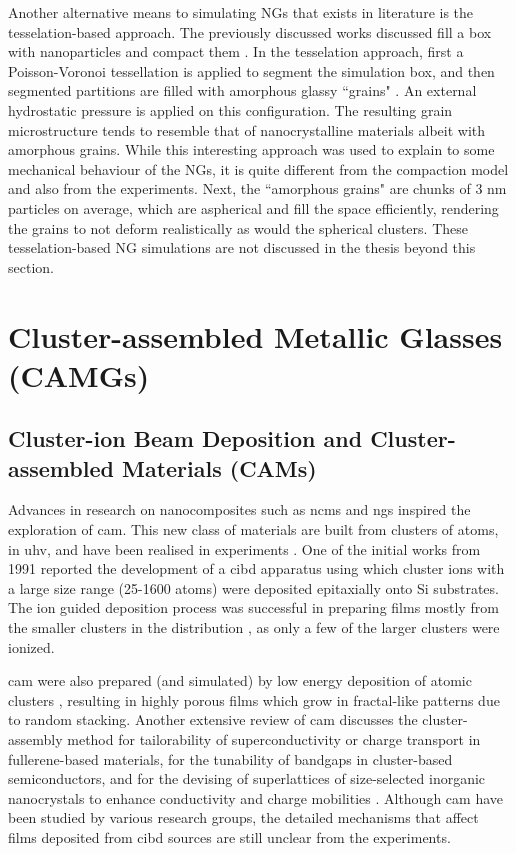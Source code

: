 Another alternative means to simulating NGs that exists in literature is the tesselation-based approach. The previously discussed works discussed fill a box with nanoparticles and compact them \cite{Sopu2009,Adjaoud2018,Adjaoud2019,Cheng2019,Cheng2019a}. In the tesselation approach, first a Poisson-Voronoi tessellation is applied to segment the simulation box, and then segmented partitions are filled with amorphous glassy ``grains" \cite{Adibi2014,Sha2017,Ma2020,Zheng2021}. An external hydrostatic pressure is applied on this configuration. The resulting grain microstructure tends to resemble that of nanocrystalline materials albeit with amorphous grains. While this interesting approach was used to explain to some mechanical behaviour of the NGs, it is quite different from the compaction model and also from the experiments. Next, the ``amorphous grains" are chunks of 3 nm particles on average, which are aspherical and  fill the space efficiently, rendering the grains to not deform realistically as would the spherical clusters. These tesselation-based NG simulations are not discussed in the thesis beyond this section. \par

\section{Cluster-assembled Metallic Glasses (CAMGs)} \label{s:camgs}

\subsection{Cluster-ion Beam Deposition and Cluster-assembled Materials (CAMs)}
Advances in research on nanocomposites such as \gls{ncm}s and \gls{ng}s inspired the exploration of \gls{cam}. This new class of materials are built from clusters of atoms, in \gls{uhv}, and have been realised in experiments \cite{Takagi1986,Takagi1988,Beuhler1986}. One of the initial works from 1991 reported the development of a \gls{cibd} apparatus using which cluster ions with a large size range (25-1600 atoms) were deposited epitaxially onto Si substrates. The ion guided deposition process was successful in preparing films mostly from the smaller clusters in the distribution \cite{Brown1991}, as only a few of the larger clusters were ionized. \par

\gls{cam} were also prepared (and simulated) by low energy deposition of atomic clusters \textcite{Perez1997}, resulting in highly porous films which grow in fractal-like patterns due to random stacking. Another extensive review of \gls{cam} discusses the cluster-assembly method for tailorability of superconductivity or charge transport in fullerene-based materials, for the tunability of bandgaps in cluster-based semiconductors, and for the devising of superlattices of size-selected inorganic nanocrystals to enhance conductivity and charge mobilities \cite{Claridge2009}. Although \gls{cam} have been studied by various research groups, the detailed mechanisms that affect films deposited from \gls{cibd} sources are still unclear from the experiments. \par


